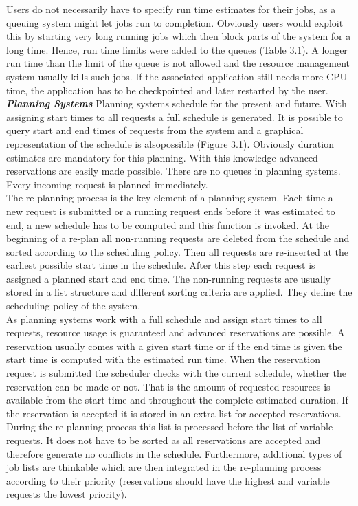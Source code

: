 Users do not necessarily have to specify run time estimates for their jobs, as a queuing system might let jobs run to completion. Obviously users would exploit this by starting very long running jobs which then block parts of the system for a long time. Hence, run time limits were added to the queues (Table 3.1). A longer run time than the limit of the queue is not allowed and the resource management system usually kills such jobs. If the associated application still needs more CPU time, the application has to be checkpointed and later restarted by the user.\\

\textbf{\textit{Planning Systems }}Planning systems schedule for the present and future. With assigning start times to all requests a full schedule is generated. It is possible to query start and end times of requests from the system and a graphical representation of the schedule is alsopossible (Figure 3.1). Obviously duration estimates are mandatory for this planning. With this knowledge advanced reservations are easily made possible. There are no queues in planning systems. Every incoming request is planned immediately.\\

The re-planning process is the key element of a planning system. Each time a new request is submitted or a running request ends before it was estimated to end, a new schedule has to be computed and this function is invoked. At the beginning of a re-plan all non-running requests are deleted from the schedule and sorted according to the scheduling policy. Then all requests are re-inserted at the earliest possible start time in the schedule. After this step each request is assigned a planned start and end time. The non-running requests are usually stored in a list structure and different sorting criteria are applied. They define the scheduling policy of the system.\\

As planning systems work with a full schedule and assign start times to all requests, resource usage is guaranteed and advanced reservations are possible. A reservation usually comes with a given start time or if the end time is given the start time is computed with the estimated run time. When the reservation request is submitted the scheduler checks with the current schedule, whether the reservation can be made or not. That is the amount of requested resources is available from the start time and throughout the complete estimated duration. If the reservation is accepted it is stored in an extra list for accepted reservations. During the re-planning process this list is processed before the list of variable requests. It does not have to be sorted as all reservations are accepted and therefore generate no conflicts in the schedule. Furthermore, additional types of job lists are thinkable which are then integrated in the re-planning process according to their priority (reservations should have the highest and variable requests the lowest priority).\\

